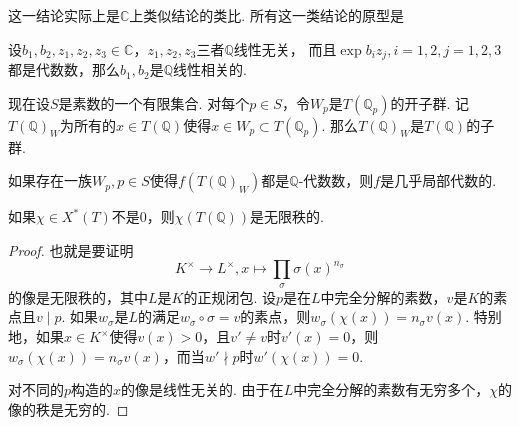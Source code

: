 这一结论实际上是$\mathbb{C}$上类似结论的类比. 所有这一类结论的原型是
\begin{cprop}
    设$b_1,b_2, z_1,z_2,z_3\in \mathbb{C}$，$z_1,z_2,z_3$三者$\mathbb{Q}$线性无关，
    而且$\exp b_iz_j, i=1,2,j=1,2,3$都是代数数，那么$b_1,b_2$是$\mathbb{Q}$线性相关的.
\end{cprop}

现在设$S$是素数的一个有限集合. 对每个$p\in S$，令$W_p$是$T(\mathbb{Q}_p)$的开子群. 记$T(\mathbb{Q})_{W}$为所有的$x\in T(\mathbb{Q})$使得$x\in W_p\subset T(\mathbb{Q}_p)$. 那么$T(\mathbb{Q})_{W}$是$T(\mathbb{Q})$的子群.

\begin{cprop}
    如果存在一族$W_p, p\in S$使得$f(T(\mathbb{Q})_W)$都是$\mathbb{Q}$-代数数，则$f$是几乎局部代数的. \label{temp::reps::loc_alg}
\end{cprop}

\begin{clem}
    如果$\chi\in X^{*}(T)$不是$0$，则$\chi(T(\mathbb{Q}))$是无限秩的.
\end{clem}

\begin{proof}
    也就是要证明
    \begin{equation}
        K^{\times}\to L^{\times}, x\mapsto \prod_{\sigma} \sigma(x)^{n_{\sigma}}
    \end{equation}
    的像是无限秩的，其中$L$是$K$的正规闭包. 设$p$是在$L$中完全分解的素数，$v$是$K$的素点且$v\mid p$.
    如果$w_{\sigma}$是$L$的满足$w_{\sigma}\circ\sigma=v$的素点，则$w_{\sigma}(\chi(x)) = n_{\sigma}v(x)$.
    特别地，如果$x\in K^{\times}$使得$v(x) > 0$，且$v'\neq v$时$v'(x) = 0$，则$w_{\sigma}(\chi(x)) = n_{\sigma}v(x)$，而当$w'\nmid p$时$w'(\chi(x))=0$.

    对不同的$p$构造的$x$的像是线性无关的. 由于在$L$中完全分解的素数有无穷多个，$\chi$的像的秩是无穷的.
\end{proof}

